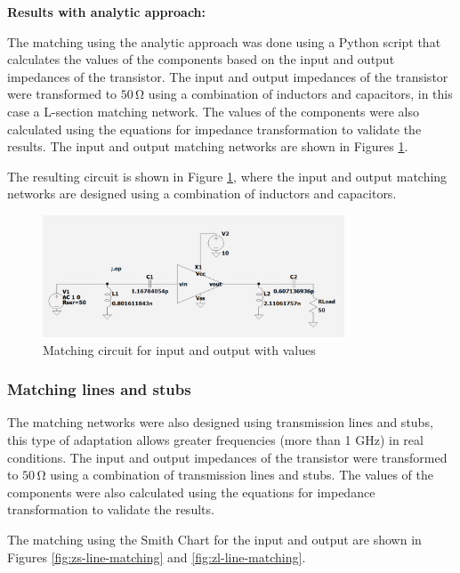 \vspace{0.4cm}
\textbf{Results with analytic approach:}
\vspace{0.4cm}

The matching using the analytic approach was done using a Python script that calculates the values of the components based on the input and output impedances of the transistor. The input and output impedances of the transistor were transformed to $50\,\si{\ohm}$ using a combination of inductors and capacitors, in this case a L-section matching network.
The values of the components were also calculated using the equations for impedance transformation to validate the results. The input and output matching networks are shown in Figures \ref{fig:MatchingCircuit}.



The resulting circuit is shown in Figure \ref{fig:MatchingCircuit}, where the input and output matching networks are designed using a combination of inductors and capacitors.

\begin{figure}[H]
    \centering
    \includegraphics[width=0.8\textwidth]{Images/LC_matching-circuit.png}
    \caption{Matching circuit for input and output with values}
    \label{fig:MatchingCircuit}
\end{figure}

\subsubsection{Matching lines and stubs}
The matching networks were also designed using transmission lines and stubs, this type of adaptation allows greater frequencies (more than 1 \si{\giga \hertz}) in real conditions. The input and output impedances of the transistor were transformed to $50\,\si{\ohm}$ using a combination of transmission lines and stubs. The values of the components were also calculated using the equations for impedance transformation to validate the results.

The matching using the Smith Chart for the input and output are shown in Figures \ref{fig:zs-line-matching} and \ref{fig:zl-line-matching}.

